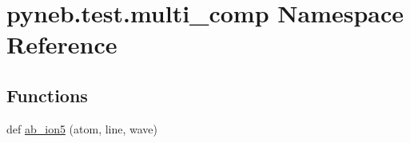 \hypertarget{namespacepyneb_1_1test_1_1multi__comp}{}\section{pyneb.\+test.\+multi\+\_\+comp Namespace Reference}
\label{namespacepyneb_1_1test_1_1multi__comp}
\subsection*{Functions}
\begin{DoxyCompactItemize}
\item 
def \hyperlink{namespacepyneb_1_1test_1_1multi__comp_a0a9d531b17c5ee87e8657bdad8f8d715}{ab\+\_\+ion5} (atom, line, wave)
\end{DoxyCompactItemize}
